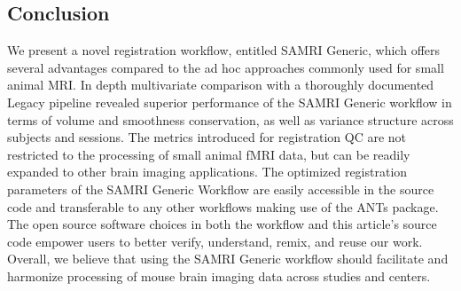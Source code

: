 \subsection{Conclusion}

We present a novel registration workflow, entitled SAMRI Generic, which offers several advantages compared to the ad hoc approaches commonly used for small animal MRI.
In depth multivariate comparison with a thoroughly documented Legacy pipeline revealed superior performance of the SAMRI Generic workflow in terms of volume and smoothness conservation, as well as variance structure across subjects and sessions.
The metrics introduced for registration QC are not restricted to the processing of small animal fMRI data, but can be readily expanded to other brain imaging applications.
The optimized registration parameters of the SAMRI Generic Workflow are easily accessible in the source code and transferable to any other workflows making use of the ANTs package.
The open source software choices in both the workflow and this article's source code empower users to better verify, understand, remix, and reuse our work.
Overall, we believe that using the SAMRI Generic workflow should facilitate and harmonize processing of mouse brain imaging data across studies and centers.
